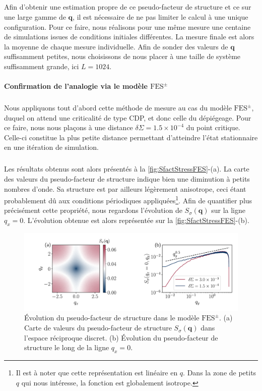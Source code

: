 \subparagraph{}Afin d'obtenir une estimation propre de ce pseudo-facteur de structure et ce sur une large gamme de $\mathbf{q}$, il est nécessaire de ne pas limiter le calcul à une unique configuration. Pour ce faire, nous réalisons pour une même mesure une centaine de simulations issues de conditions initiales différentes. La mesure finale est alors la moyenne de chaque mesure individuelle. Afin de sonder des valeurs de $\mathbf{q}$ suffisamment petites, nous choisissons de nous placer à une taille de système suffisamment grande, ici $L=1024$.

\paragraph{Confirmation de l'analogie via le modèle $\text{FES}^\pm$}

\subparagraph{}Nous appliquons tout d'abord cette méthode de mesure au cas du modèle $\text{FES}^\pm$, duquel on attend une criticalité de type CDP, et donc celle du dépiégeage. Pour ce faire, nous nous plaçons à une distance $\delta\Sigma = 1.5\times 10^{-4}$ du point critique. Celle-ci constitue la plus petite distance permettant d'atteindre l'état stationnaire en une itération de simulation.

\subparagraph{}Les résultats obtenus sont alors présentés à la \autoref{fig:SfactStressFES}-(a). La carte des valeurs du pseudo-facteur de structure indique bien une diminution à petits nombres d'onde. Sa structure est par ailleurs légèrement anisotrope, ceci étant probablement dû aux conditions périodiques appliquées\footnote{Il est à noter que cette représentation est linéaire en $q$. Dans la zone de petits $q$ qui nous intéresse, la fonction est globalement isotrope.}. Afin de quantifier plus précisément cette propriété, nous regardons l'évolution de $S_\sigma(\mathbf{q})$ sur la ligne $q_x = 0$. L'évolution obtenue est alors représentée sur la \autoref{fig:SfactStressFES}-(b).

\begin{figure}[h]
	\centering	\includegraphics[width=\textwidth]{Chapitre4/Figures/Correlations/Sfact_SRPNC.pdf}
	\caption{Évolution du pseudo-facteur de structure dans le modèle $\text{FES}^\pm$. (a) Carte de valeurs du pseudo-facteur de structure $S_\sigma(\mathbf{q})$ dans l'espace réciproque discret. (b) Évolution du pseudo-facteur de structure le long de la ligne $q_x=0$.}
	\label{fig:SfactStressFES}
\end{figure}

